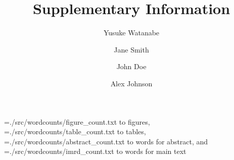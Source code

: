 \documentclass[preprint,review,12pt]{elsarticle}%
\newcommand\readwordcount[1]{%
  \openin\wordcount=#1
  \read\wordcount to \thewordcount
  \closein\wordcount
  \thewordcount
}
\begin{document}
\begin{frontmatter}
    \title{Supplementary Information}


\author[1,2]{Yusuke Watanabe}
\author[3]{Jane Smith}
\author[4]{John Doe}
\author[1,5]{Alex Johnson}

\address[1]{Institute for Advanced Cocreation Studies, Osaka University, 2-2 Yamadaoka, Suita, 565-0871, Osaka, Japan}
\address[2]{NeuroEngineering Research Laboratory, Department of Biomedical Engineering, The University of Melbourne, Parkville VIC 3010, Australia}
\address[3]{Department of Computer Science, Stanford University, Stanford, CA 94305, USA}
\address[4]{Digital Humanities Center, University of Oxford, Oxford OX1 2JD, UK}
\address[5]{Center for Scientific Document Analysis, National Institute of Informatics, Tokyo 101-8430, Japan}


\end{frontmatter}

\begin{wordcount}
\readwordcount{./src/wordcounts/figure_count.txt} figures, \readwordcount{./src/wordcounts/table_count.txt} tables, \readwordcount{./src/wordcounts/abstract_count.txt} words for abstract, and \readwordcount{./src/wordcounts/imrd_count.txt} words for main text
\end{wordcount}

\end{document}
